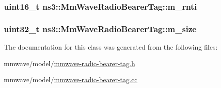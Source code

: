 \subsubsection[{\texorpdfstring{m\+\_\+rnti}{m_rnti}}]{\setlength{\rightskip}{0pt plus 5cm}uint16\+\_\+t ns3\+::\+Mm\+Wave\+Radio\+Bearer\+Tag\+::m\+\_\+rnti\hspace{0.3cm}{\ttfamily [private]}}\hypertarget{classns3_1_1MmWaveRadioBearerTag_aca3c3782a320065bcc3dbcb54f62f96f}{}\label{classns3_1_1MmWaveRadioBearerTag_aca3c3782a320065bcc3dbcb54f62f96f}
\subsubsection[{\texorpdfstring{m\+\_\+size}{m_size}}]{\setlength{\rightskip}{0pt plus 5cm}uint32\+\_\+t ns3\+::\+Mm\+Wave\+Radio\+Bearer\+Tag\+::m\+\_\+size\hspace{0.3cm}{\ttfamily [private]}}\hypertarget{classns3_1_1MmWaveRadioBearerTag_aa4af9d40daf1f0311b3ee455b9dbf1c5}{}\label{classns3_1_1MmWaveRadioBearerTag_aa4af9d40daf1f0311b3ee455b9dbf1c5}


The documentation for this class was generated from the following files\+:\begin{DoxyCompactItemize}
\item 
mmwave/model/\hyperlink{mmwave-radio-bearer-tag_8h}{mmwave-\/radio-\/bearer-\/tag.\+h}\item 
mmwave/model/\hyperlink{mmwave-radio-bearer-tag_8cc}{mmwave-\/radio-\/bearer-\/tag.\+cc}\end{DoxyCompactItemize}
